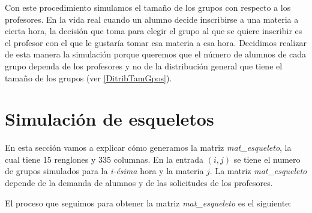 Con este procedimiento simulamos el tamaño de los grupos con respecto a los profesores. En la vida real cuando un alumno decide inscribirse a una materia a cierta hora, la decisión que toma para elegir el grupo al que se quiere inscribir es el profesor con el que le gustaría tomar esa materia a esa hora. Decidimos realizar de esta manera la simulación porque queremos que el número de alumnos de cada grupo dependa de los profesores y no de la distribución general que tiene el tamaño de los grupos (ver \ref{DitribTamGpos}).





\section{Simulación de esqueletos}

En esta sección vamos a explicar cómo generamos la matriz \textit{mat\_esqueleto}, la cual tiene 15 renglones y 335 columnas. En la entrada $(i,j)$ se tiene el numero de grupos simulados para la \textit{i-ésima} hora y la materia $j$. La matriz \textit{mat\_esqueleto} depende de la demanda de alumnos y de las solicitudes de los profesores.

El proceso que seguimos para obtener la matriz \textit{mat\_esqueleto} es el siguiente:

